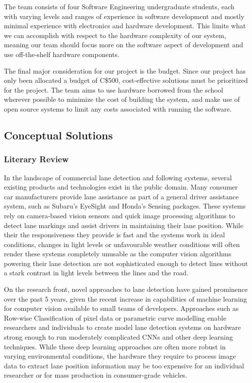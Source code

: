 \documentclass[titlepage,draft]{article}
\begin{document}
The team consists of four Software Engineering undergraduate students, each with varying levels and ranges of experience in software development and mostly minimal experience with electronics and hardware development. This limits what we can accomplish with respect to the hardware complexity of our system, meaning our team should focus more on the software aspect of development and use off-the-shelf hardware components.

The final major consideration for our project is the budget. Since our project has only been allocated a budget of C\$500, cost-effective solutions must be prioritized for the project. The team aims to use hardware borrowed from the school wherever possible to minimize the cost of building the system, and make use of open source systems to limit any costs associated with running the software.

\subsection{Conceptual Solutions}

\subsubsection{Literary Review}

In the landscape of commercial lane detection and following systems, several existing products and technologies exist in the public domain. Many consumer car manufacturers provide lane assistance as part of a general driver assistance system, such as Subaru's EyeSight\cite{subaru_eyesight} and Honda's Sensing \cite{honda_sensing} packages. These systems rely on camera-based vision sensors and quick image processing algorithms to detect lane markings and assist drivers in maintaining their lane position. While their the responsiveness they provide is fast and the systems work in ideal conditions, changes in light levels or unfavourable weather conditions will often render these systems completely unusable as the computer vision algorithms powering their lane detection are not sophisticated enough to detect lines without a stark contrast in light levels between the lines and the road.


On the research front, novel approaches to lane detection have gained prominence over the past 5 years, given the recent increase in capabilities of machine learning for computer vision available to small teams of developers. Approaches such as Row-wise Classification\cite{rowwiseclass} of pixel data or parametric curve modelling \cite{feng2023rethinking} enable researchers and individuals to create model lane detection systems on hardware strong enough to run moderately complicated CNNs and other deep learning techniques. While these deep learning approaches are often more robust in varying environmental conditions, the hardware they require to process image data to extract lane position information may be too expensive for an individual researcher or for mass production in consumer-grade vehicles.
\end{document}

